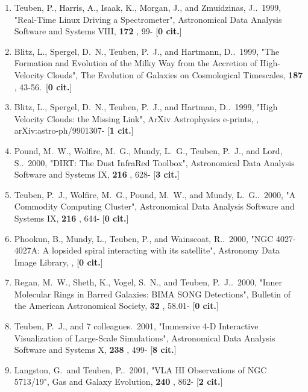 \documentclass[11pt,letterpaper]{article}
\begin{document}
\begin{enumerate}[resume,label=\textbf{\arabic*}.]
\item  
Teuben, P., Harris, A., Isaak, K., Morgan, J., and Zmuidzinas, J..\  1999,  
"Real-Time Linux Driving a Spectrometer", Astronomical Data Analysis 
Software and Systems VIII,  {\bf 172} , 99- [{\bf 0 cit.}] 

\item  
Blitz, L., Spergel, D.~N., Teuben, P.~J., and Hartmann, D..\  1999,  "The 
Formation and Evolution of the Milky Way from the Accretion of 
High-Velocity Clouds", The Evolution of Galaxies on Cosmological 
Timescales,  {\bf 187} , 43-56.\  [{\bf 0 cit.}] 

\item  
Blitz, L., Spergel, D.~N., Teuben, P.~J., and Hartman, D..\  1999,  "High 
Velocity Clouds: the Missing Link", ArXiv Astrophysics e-prints,  , 
arXiv:astro-ph/9901307- [{\bf 1 cit.}] 

\item  
Pound, M.~W., Wolfire, M.~G., Mundy, L.~G., Teuben, P.~J., and Lord, S..\  
2000,  "DIRT: The Dust InfraRed Toolbox", Astronomical Data Analysis 
Software and Systems IX,  {\bf 216} , 628- [{\bf 3 cit.}] 

\item  
Teuben, P.~J., Wolfire, M.~G., Pound, M.~W., and Mundy, L.~G..\  2000,  "A 
Commodity Computing Cluster", Astronomical Data Analysis Software and 
Systems IX,  {\bf 216} , 644- [{\bf 0 cit.}] 

\item  
Phookun, B., Mundy, L., Teuben, P., and Wainscoat, R..\  2000,  "NGC 
4027-4027A: A lopsided spiral interacting with its satellite", Astronomy 
Data Image Library,  ,  [{\bf 0 cit.}] 

\item  
Regan, M.~W., Sheth, K., Vogel, S.~N., and Teuben, P.~J..\  2000,  "Inner 
Molecular Rings in Barred Galaxies: BIMA SONG Detections", Bulletin of the 
American Astronomical Society,  {\bf 32} , 58.01- [{\bf 0 cit.}] 

\item  
Teuben, P.~J., and 7 colleagues.\  2001,  "Immersive 4-D Interactive 
Visualization of Large-Scale Simulations", Astronomical Data Analysis 
Software and Systems X,  {\bf 238} , 499- [{\bf 8 cit.}] 

\item  
Langston, G.~and Teuben, P..\  2001,  "VLA HI Observations of NGC 5713/19", 
Gas and Galaxy Evolution,  {\bf 240} , 862- [{\bf 2 cit.}] 


\end{enumerate}
\end{document}
